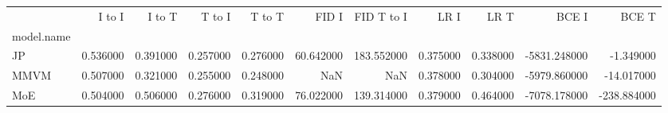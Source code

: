 \begin{tabular}{lrrrrrrrrrr}
\toprule
 & I to I & I to T & T to I & T to T & FID I & FID T to I & LR I & LR T & BCE I & BCE T \\
model.name &  &  &  &  &  &  &  &  &  &  \\
\midrule
JP & 0.536000 & 0.391000 & 0.257000 & 0.276000 & 60.642000 & 183.552000 & 0.375000 & 0.338000 & -5831.248000 & -1.349000 \\
MMVM & 0.507000 & 0.321000 & 0.255000 & 0.248000 & NaN & NaN & 0.378000 & 0.304000 & -5979.860000 & -14.017000 \\
MoE & 0.504000 & 0.506000 & 0.276000 & 0.319000 & 76.022000 & 139.314000 & 0.379000 & 0.464000 & -7078.178000 & -238.884000 \\
\bottomrule
\end{tabular}

